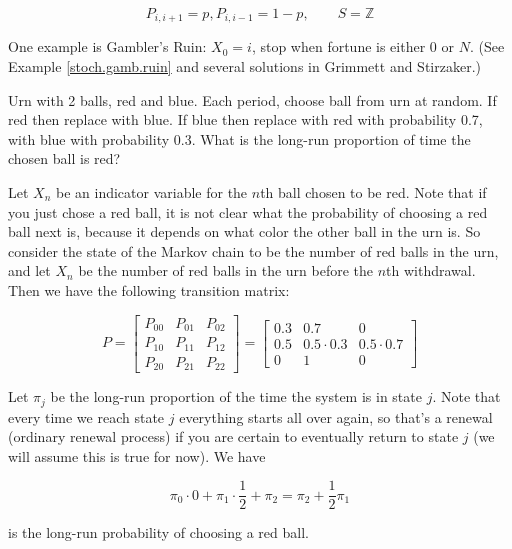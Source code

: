 \begin{example} 

\[
P_{i,i+1} = p, P_{i, i-1} = 1 - p, \qquad S= \mathbb{Z}
\]

One example is Gambler's Ruin: \(X_0 =i\), stop when fortune is either 0 or \(N\). (See Example \ref{stoch.gamb.ruin} and several solutions in Grimmett and Stirzaker.)

\end{example}

\begin{example}  Urn with 2 balls, red and blue. Each period, choose ball from urn at random. If red then replace with blue. If blue then replace with red with probability 0.7, with blue with probability 0.3. What is the long-run proportion of time the chosen ball is red?

\end{example}

\begin{solution} Let \(X_n\) be an indicator variable for the \(n\)th ball chosen to be red. Note that if you just chose a red ball, it is not clear what the probability of choosing a red ball next is, because it depends on what color the other ball in the urn is. So consider the state of the Markov chain to be the number of red balls in the urn, and let \(X_n\) be the number of red balls in the urn before the \(n\)th withdrawal. Then we have the following transition matrix:

\[
P = \begin{bmatrix}
P_{00} & P_{01} & P_{02} \\
P_{10} & P_{11} & P_{12} \\
P_{20} & P_{21} & P_{22} 
\end{bmatrix} = \begin{bmatrix}
0.3 & 0.7 & 0 \\
0.5 & 0.5 \cdot 0.3 & 0.5 \cdot 0.7 \\
0 & 1 & 0
\end{bmatrix}
\]

Let \(\pi_j\) be the long-run proportion of the time the system is in state \(j\). Note that every time we reach state \(j\) everything starts all over again, so that's a renewal (ordinary renewal process) if you are certain to eventually return to state \(j\) (we will assume this is true for now). We have

\[
\pi_0 \cdot 0 + \pi_1 \cdot \frac{1}{2} + \pi_2 = \pi_2 + \frac{1}{2} \pi_1
\]

is the long-run probability of choosing a red ball.

\end{solution}

